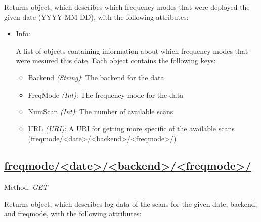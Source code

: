 Returns object, which describes which frequency modes that were deployed the
given date (YYYY-MM-DD), with the following attributes:
\begin{itemize}
    \item Info:

        A list of objects containing information about which
        frequency modes that were mesured this date. 
        Each object contains the following keys:

        \begin{itemize}
            \item Backend \emph{(String)}: The backend for the data
            \item FreqMode \emph{(Int)}: The frequency mode for the data
            \item NumScan \emph{(Int)}: The number of available scans
            \item URL \emph{(URI)}: A URI 
                for getting more specific of the available scans\\ 
                 (\url{freqmode/<date>/<backend>/<freqmode>/})
        \end{itemize}
\end{itemize}

\subsection*{\url{freqmode/<date>/<backend>/<freqmode>/}}
Method: \emph{GET}

Returns object, which describes log data of the scans  
for the given date, backend, and freqmode,
with the following attributes:

